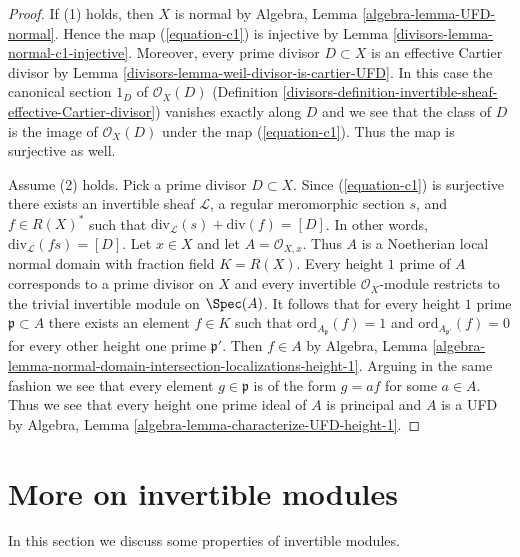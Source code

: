 \begin{proof}

If (1) holds, then $X$ is normal by
Algebra, Lemma \ref{algebra-lemma-UFD-normal}.
Hence the map (\ref{equation-c1}) is injective by
Lemma \ref{divisors-lemma-normal-c1-injective}. Moreover,
every prime divisor $D \subset X$ is an effective
Cartier divisor by Lemma \ref{divisors-lemma-weil-divisor-is-cartier-UFD}.
In this case the canonical section $1_D$ of $\mathcal{O}_X(D)$
(Definition \ref{divisors-definition-invertible-sheaf-effective-Cartier-divisor})
vanishes exactly along $D$ and we see that the class of $D$ is the
image of $\mathcal{O}_X(D)$ under the map (\ref{equation-c1}).
Thus the map is surjective as well.

\medskip\noindent
Assume (2) holds. Pick a prime divisor $D \subset X$.
Since (\ref{equation-c1}) is surjective there exists an invertible
sheaf $\mathcal{L}$, a regular meromorphic section $s$, and $f \in R(X)^*$
such that $\text{div}_\mathcal{L}(s) + \text{div}(f) = [D]$.
In other words, $\text{div}_\mathcal{L}(fs) = [D]$.
Let $x \in X$ and let $A = \mathcal{O}_{X, x}$. Thus $A$ is
a Noetherian local normal domain with fraction field $K = R(X)$.
Every height $1$ prime of $A$ corresponds to a prime divisor on $X$
and every invertible $\mathcal{O}_X$-module restricts to the
trivial invertible module on $\Spec(A)$. It follows that for every
height $1$ prime $\mathfrak p \subset A$ there exists an element $f \in K$
such that $\text{ord}_{A_\mathfrak p}(f) = 1$ and
$\text{ord}_{A_{\mathfrak p'}}(f) = 0$ for every other
height one prime $\mathfrak p'$. Then $f \in A$ by Algebra, Lemma
\ref{algebra-lemma-normal-domain-intersection-localizations-height-1}.
Arguing in the same fashion we see that every element $g \in \mathfrak p$
is of the form $g = af$ for some $a \in A$. Thus we see that every
height one prime ideal of $A$ is principal and $A$ is a UFD
by Algebra, Lemma \ref{algebra-lemma-characterize-UFD-height-1}.
\end{proof}

\section{More on invertible modules}
\label{divisors-section-invertible-modules}
In this section we discuss some properties of invertible modules.

